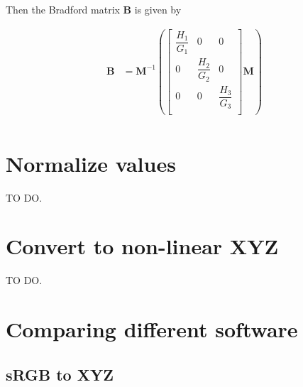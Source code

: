 \documentclass{article}
\begin{document}
Then the Bradford matrix $\mathbf{B}$ is given by

\begin{align}
\mathbf{B} &= \mathbf{M}^{-1}
\left(\left[\begin{matrix} \dfrac{H_1}{G_1} & 0 & 0 \\ 0 & \dfrac{H_2}{G_2} & 0 \\ 0 & 0 & \dfrac{H_3}{G_3} \\ \end{matrix}\right] \mathbf{M}\right) \\
\end{align}


\section{Normalize values}

TO DO.

\section{Convert to non-linear XYZ}

TO DO.


\section{Comparing different software}

\subsection{sRGB to XYZ}
\end{document}
